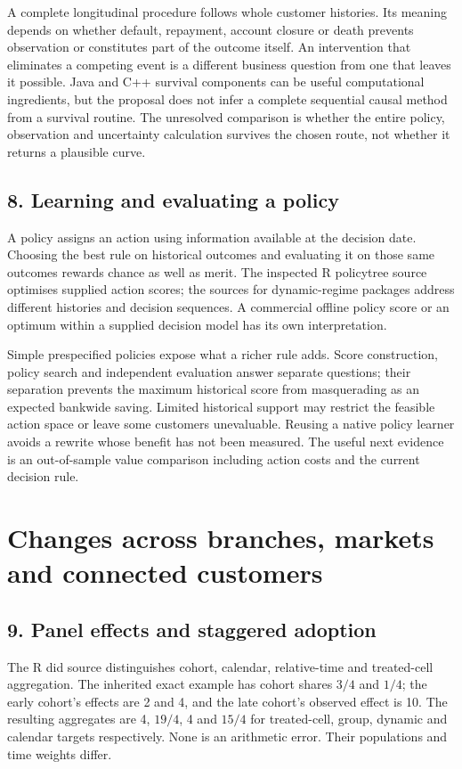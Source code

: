 A complete longitudinal procedure follows whole customer histories. Its
meaning depends on whether default, repayment, account closure or death
prevents observation or constitutes part of the outcome itself.
An intervention that eliminates a competing event is a different business
question from one that leaves it possible. Java and C++ survival components
can be useful computational ingredients, but the proposal does not infer a
complete sequential causal method from a survival routine. The unresolved
comparison is whether the entire policy, observation and uncertainty calculation
survives the chosen route, not whether it returns a plausible curve.

\subsection{8. Learning and evaluating a policy}
A policy assigns an action using information available at the decision date.
Choosing the best rule on historical outcomes and evaluating it on those same
outcomes rewards chance as well as merit. The inspected R policytree source
optimises supplied action scores; the sources for dynamic-regime packages
address different histories and decision sequences. A commercial offline
policy score or an optimum within a supplied decision model has its own
interpretation.
\citep{exec24_policiesr_policytree,exec24_policiesr_dtrreg,
exec24_policiesr_polle,exec16_cp_bayesfusion,exec13_ch_stata}

Simple prespecified policies expose what a richer rule adds. Score
construction, policy search and independent evaluation answer separate
questions; their separation prevents the maximum historical score from
masquerading as an expected bankwide saving. Limited historical support may
restrict the feasible action space or leave some customers unevaluable.
Reusing a native policy learner avoids a rewrite whose benefit has not been
measured. The useful next evidence is an out-of-sample value comparison
including action costs and the current decision rule.

\section{Changes across branches, markets and connected customers}

\subsection{9. Panel effects and staggered adoption}
The R did source distinguishes cohort, calendar, relative-time and treated-cell
aggregation. The inherited exact example has cohort shares $3/4$ and $1/4$;
the early cohort's effects are 2 and 4, and the late cohort's observed effect
is 10. The resulting aggregates are 4, $19/4$, 4 and $15/4$ for treated-cell,
group, dynamic and calendar targets respectively. None is an arithmetic error.
Their populations and time weights differ.
\citep{exec24_panelr_did}

